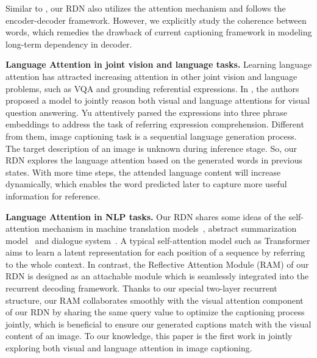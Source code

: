 \documentclass[10pt,twocolumn,letterpaper]{article}
\begin{document}
Similar to \cite{anderson2017bottom,lu2018neural,yao2018exploring}, our RDN also utilizes the attention mechanism and follows the encoder-decoder framework.
However, we explicitly study the coherence between words, which remedies the drawback of current captioning framework in modeling long-term dependency in decoder.

\smallskip\noindent\textbf{Language Attention in joint vision and language tasks.}
Learning language attention has attracted increasing attention in other joint vision and language problems, such as VQA and grounding referential expressions.
In \cite{lu2016hierarchical}, the authors proposed a model to jointly reason both visual and language attentions for visual question answering.
Yu \etal \cite{yu2018mattnet} attentively parsed the expressions into three phrase embeddings to address the task of referring expression comprehension.
Different from them, image captioning task is a sequential language generation process.
The target description of an image is unknown during inference stage.
So, our RDN explores the language attention based on the generated words in previous states. 
With more time steps, the attended language content will increase dynamically, which enables the word predicted later to capture more useful information for reference.

\vspace{-0.02in}
\smallskip\noindent\textbf{Language Attention in NLP tasks.}
Our RDN shares some ideas of the self-attention mechanism in machine translation models~\cite{miculicich2018self,tran2016recurrent,vaswani2017attention}, abstract summarization model~\cite{paulus2017deep} and dialogue system~\cite{mei2017coherent}. 
A typical self-attention model such as Transformer \cite{vaswani2017attention} aims to learn a latent representation for each position of a sequence by referring to the whole context.
In contrast, the Reflective Attention Module (RAM) of our RDN is designed as an attachable module which is seamlessly integrated into the recurrent decoding framework.
Thanks to our special two-layer recurrent structure, our RAM collaborates smoothly with the visual attention component of our RDN by sharing the same query value to optimize the captioning process jointly, which is beneficial to ensure our generated captions match with the visual content of an image.
To our knowledge, this paper is the first work in jointly exploring both visual and language attention in image captioning.
\vspace{-0.15in}
\end{document}
